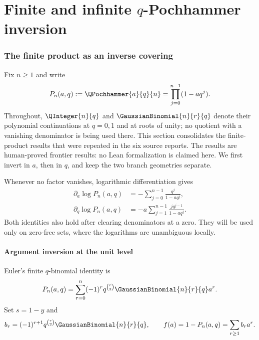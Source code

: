 \part{Finite and infinite \texorpdfstring{\(q\)}{q}-Pochhammer inversion}

\section{The finite product as an inverse covering}
\label{fp-finite-covering}

Fix \(n\geq1\) and write
\[
 P_n(a,q):=\QPochhammer{a}{q}{n}=\prod_{j=0}^{n-1}(1-aq^j).
\]
Throughout, \(\QInteger{n}{q}\) and \(\GaussianBinomial{n}{r}{q}\) denote their polynomial
continuations at \(q=0,1\) and at roots of unity; no quotient with a vanishing
denominator is being used there.
This section consolidates the finite-product results that were repeated in the
six source reports.  The results are human-proved frontier results: no Lean
formalization is claimed here.  We first invert in \(a\), then in \(q\), and
keep the two branch geometries separate.

Whenever no factor vanishes, logarithmic differentiation gives
\begin{align}
 \partial_a\log P_n(a,q)
  &=-\sum_{j=0}^{n-1}\frac{q^j}{1-aq^j},
  \label{fp-a-logder}\\
 \partial_q\log P_n(a,q)
  &=-a\sum_{j=1}^{n-1}\frac{j q^{j-1}}{1-aq^j}.
  \label{fp-q-logder}
\end{align}
Both identities also hold after clearing denominators at a zero.  They will be
used only on zero-free sets, where the logarithms are unambiguous locally.

\subsection{Argument inversion at the unit level}

Euler's finite \(q\)-binomial identity is
\begin{equation}
 P_n(a,q)=\sum_{r=0}^{n}(-1)^r q^{\binom r2}
 \GaussianBinomial{n}{r}{q}a^r.
 \label{fp-finite-q-binomial}
\end{equation}
Set \(s=1-y\) and
\[
 b_r=(-1)^{r+1}q^{\binom r2}\GaussianBinomial{n}{r}{q},
 \qquad f(a)=1-P_n(a,q)=\sum_{r\geq1}b_ra^r.
\]

